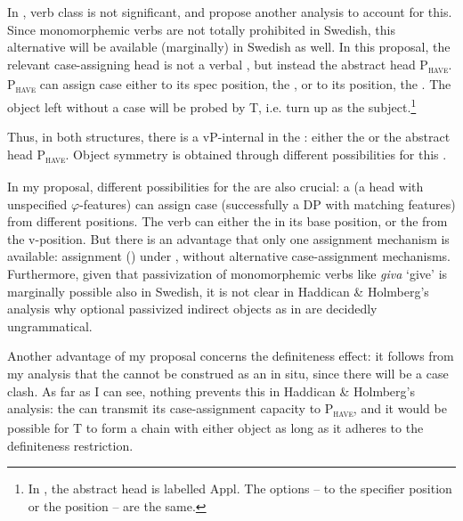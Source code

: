 \documentclass[output=paper]{langscibook}
\begin{document}
In , verb class is not significant, and \citet{HaddicanHolmberg2019} propose another analysis to account for this. Since  monomorphemic  verbs are not totally prohibited in Swedish, this alternative will be available (marginally) in Swedish as well. In this proposal, the relevant case-assigning head is not a verbal , but instead the abstract head P\textsc{\textsubscript{have}}. P\textsc{\textsubscript{have}} can assign case either to its spec position, the , or to its  position, the . The object left without a case will be probed by T, i.e. turn up as the subject.\footnote{In \citet{HolmbergEtAl2019}, the abstract head is labelled Appl. The options –  to the specifier position or the  position – are the same.} 



Thus, in both structures, there is a vP-internal  in the : either the  or the abstract head P\textsc{\textsubscript{have}}. Object symmetry is obtained through different possibilities for this . 



In my proposal, different possibilities for the  are also crucial: a  (a head with unspecified $\varphi ${}-features) can assign case (successfully  a DP with matching features) from different positions. The verb can either  the  in its base position, or the  from the v-position. But there is an advantage that only one assignment mechanism is available: assignment () under , without alternative case-assignment mechanisms. Furthermore, given that passivization of monomorphemic verbs like \textit{giva} ‘give’ is marginally possible also in Swedish, it is not clear in Haddican \& Holmberg’s analysis why optional passivized indirect objects as in  are decidedly ungrammatical.



Another advantage of my proposal concerns the definiteness effect: it follows from my analysis that the  cannot be construed as an  in situ, since there will be a case clash. As far as I can see, nothing prevents this in Haddican \& Holmberg’s analysis: the  can transmit its case-assignment capacity to P\textsc{\textsubscript{have}}, and it would be possible for T to form a chain with either object as long as it adheres to the definiteness restriction.
\end{document}
